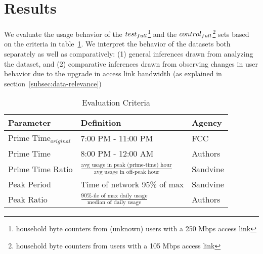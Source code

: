 \section{Results}
\label{sec:results}

We evaluate the usage behavior of the $test_{full}$\footnote{household byte counters
from (unknown) users with a 250 Mbps access link}  and the $control_{full}$\footnote{household
byte counters from users with a 105 Mbps access link} sets based
on the criteria in table~\ref{tab:eval-criteria}. We interpret the behavior of the datasets
both separately as well as comparatively: (1) general inferences drawn from analyzing the dataset,
and (2) comparative inferences drawn from observing changes in user behavior due to the upgrade
in access link bandwidth (as explained in section~\ref{subsec:data-relevance})

\begin{table}[ht!]
\small 
\begin{tabular}{|l|l|l|}
\hline
\textbf{Parameter}				& \textbf{Definition}				& \textbf{Agency}  \\ \hline
Prime Time$_{original}$			& 7:00 PM - 11:00 PM				& FCC       \\
Prime Time       				& 8:00 PM - 12:00 AM                & Authors       \\
Prime Time Ratio 				& \( \frac{ \text{avg usage in peak (prime-time) hour}}{ \text{avg usage in off-peak hour}}\) 												& Sandvine  \\
Peak Period						& Time of network 95\% of max      	& Sandvine \\
Peak Ratio       				& \(\frac{\text{90\%-ile of max daily usage}}{\text{median of daily usage}}\)                											& Authors \\\hline
\end{tabular}
\caption{Evaluation Criteria}
\label{tab:eval-criteria}
\end{table}





%